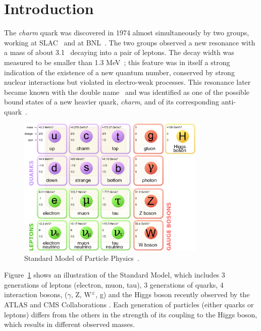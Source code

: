 \documentclass[12pt, a4paper, twoside, titlepage]{article}
\begin{document}
\section{Introduction}
The \emph{charm} quark was discovered in 1974 almost simultaneously by two groups, working at SLAC~\cite{Richter:1974} and at BNL~\cite{Ting:1974}.
The two groups observed a new resonance with a mass of about 3.1 \GeVcsq\ decaying into a pair of leptons.
The decay width was measured to be smaller than 1.3 MeV~\cite{Richter:1974}; this feature
was in itself a strong indication of the existence of a new quantum number, conserved by strong nuclear interactions 
but violated in electro-weak processes.
This resonance later became known with the double name \jpsi\ and was identified as one of the possible bound states
of a new heavier quark, \emph{charm}, and of its corresponding anti-quark~\cite{Appelquist:1975, DeRujula:1975}. 

\begin{figure}[tbh]
\begin{center}
\includegraphics[width=0.8\textwidth]{img/standard_model}
 \caption{Standard Model of Particle Physics~\cite{Wikipedia:StandardModel}.} 
 \label{fig:standard_model}
\end{center}
\end{figure}

Figure~\ref{fig:standard_model} shows an illustration of the Standard Model, which includes
3 generations of leptons (electron, muon, tau), 3 generations of quarks, 4 interaction bosons, ($\gamma$, Z, $\mathrm{W}^{\pm}$, g) and the Higgs boson
recently observed by the ATLAS and CMS Collaborations \cite{ATLAS:2012b,CMS:2012d}.
Each generation of particles (either quarks or leptons) differs from the others in the strength of its coupling to the Higgs boson,
which results in different observed masses.
\end{document}
